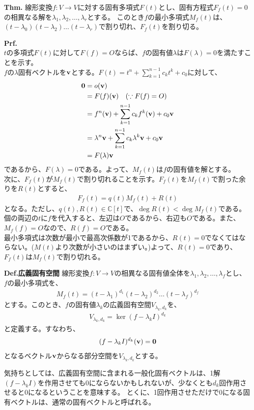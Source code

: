 \documentclass[a4paper,11pt]{jsarticle}
\numberwithin{equation}{section}
\begin{document}
\begin{itembox}[l]{\textbf{Thm.}}
    線形変換$f: V \to V$に対する固有多項式$F(t)$とし、固有方程式$F_f(t) = 0$の相異なる解を$\lambda_1, \lambda_2, \dots, \lambda_r$とする。
    このとき$f$の最小多項式$M_f(t)$は、$(t-\lambda_0)(t-\lambda_2)\dots(t-\lambda_r)$で割り切れ、$F_f(t)$を割り切る。
\end{itembox}
\textbf{Prf.}\\
$t$の多項式$F(t)$に対して$F(f) = O$ならば、$f$の固有値$\lambda$は$F(\lambda) = 0$を満たすことを示す。\\
$f$の$\lambda$固有ベクトルを$\vb{v}$とする。$F(t) = t^n + \sum_{k=1}^{n-1} c_kt^k + c_0$に対して、
\begin{align}
    \vb{0} &= o(\vb{v})\\
    &= F(f)(\vb{v})\quad (\because F(f) = O)\\
    &= f^{n}(\vb{v}) + \sum_{k=1}^{n-1} c_kf^{k}(\vb{v}) + c_0\vb{v}\\
    &= \lambda^{n}\vb{v} + \sum_{k=1}^{n-1} c_k\lambda^{k}\vb{v} + c_0\vb{v}\\
    &= F(\lambda)\vb{v}
\end{align}
であるから、$F(\lambda) = 0$である。よって、$M_f(t)$は$f$の固有値を解とする。\\
次に、$F_f(t)$が$M_f(t)$で割り切れることを示す。$F_f(t)$を$M_f(t)$で割った余りを$R(t)$とすると、
\begin{align}
    F_f(t) = q(t)M_f(t) + R(t)
\end{align}
となる。ただし、$q(t),R(t) \in \mathbb{C}[t]$で、$\deg R(t) < \deg M_f(t)$である。\\
個の両辺の$t$に$f$を代入すると、左辺は$O$であるから、右辺も$O$である。また、$M_f(f) = O$なので、$R(f) = O$である。\\
最小多項式は次数が最小で最高次係数が1であるから、$R(t) = 0$でなくてはならない。($M(t)$より次数が小さいのはまずい。)よって、$R(t) = 0$であり、$F_f(t)$は$M_f(t)$で割り切れる。\hfill\qedsymbol\\

\begin{itembox}[l]{\textbf{Def.広義固有空間}}
  線形変換$f: V \to V$の相異なる固有値全体を$\lambda_1, \lambda_2, \dots, \lambda_f$とし、
  $f$の最小多項式を、
  \begin{align}
      M_f(t) = (t-\lambda_1)^{d_1}(t-\lambda_2)^{d_2}\dots(t-\lambda_f)^{d_f}
  \end{align}
  とする。このとき、$f$の固有値$\lambda_k$の広義固有空間$V_{\lambda_k,d_k}$を、
  \begin{align}
      V_{\lambda_k,d_k} = \ker (f-\lambda_kI)^{d_k}
  \end{align}
  と定義する。すなわち、
  \begin{align}
      (f-\lambda_kI)^{d_k}(\vb{v}) = \vb{0}
  \end{align}
  となるベクトル$\vb{v}$からなる部分空間を$V_{\lambda_k,d_k}$とする。
\end{itembox}
気持ちとしては、広義固有空間に含まれる一般化固有ベクトルは、1解$(f-\lambda_kI)$を作用させても$0$にならないかもしれないが、少なくとも$d_k$回作用させると$0$になるということを意味する。
とくに、1回作用させただけで$0$になる固有ベクトルは、通常の固有ベクトルと呼ばれる。\\
\end{document}
